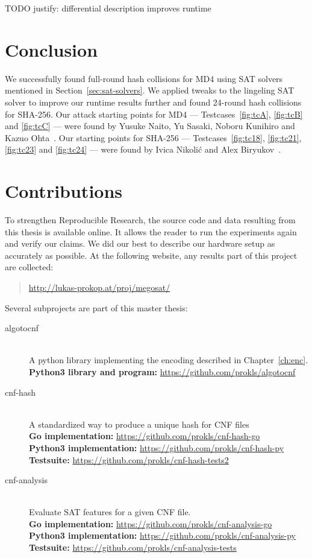 TODO justify: differential description improves runtime


\section{Conclusion}
\label{sec:conclusion}
%
We successfully found full-round hash collisions for MD4
using SAT solvers mentioned in Section~\ref{sec:sat-solvers}.
We applied tweaks to the lingeling SAT solver to improve our
runtime results further and found 24-round hash collisions
for SHA-256. Our attack starting points for MD4 ---
Testcases~\ref{fig:tcA}, \ref{fig:tcB} and \ref{fig:tcC} ---
were found by Yusuke Naito, Yu Sasaki, Noboru Kunihiro and
Kazuo Ohta~\cite{sasaki2007new}. Our starting points for SHA-256
--- Testcases~\ref{fig:tc18}, \ref{fig:tc21}, \ref{fig:tc23}
and \ref{fig:tc24} --- were found by Ivica Nikoli{\'c} and
Alex Biryukov~\cite{nikolic2008collisions}.

\section{Contributions}
\label{sec:contributions}
%
To strengthen Reproducible Research, the source code and data resulting from this thesis is available online.
It allows the reader to run the experiments again and verify our claims.
We did our best to describe our hardware setup as accurately as possible.
At the following website, any results part of this project are collected:

\begin{quote}
  \url{http://lukas-prokop.at/proj/megosat/}
\end{quote}

Several subprojects are part of this master thesis:
\begin{description}
\item[algotocnf]\hfill{} \\
  A python library implementing the encoding described in Chapter~\ref{ch:enc}. \\[4pt]
  \textbf{Python3 library and program:} \url{https://github.com/prokls/algotocnf}
\item[cnf-hash]\hfill{} \\
  A standardized way to produce a unique hash for CNF files \\[4pt]
  \textbf{Go implementation:} \url{https://github.com/prokls/cnf-hash-go} \\
  \textbf{Python3 implementation:} \url{https://github.com/prokls/cnf-hash-py} \\
  \textbf{Testsuite:} \url{https://github.com/prokls/cnf-hash-tests2}
\item[cnf-analysis]\hfill{} \\
  Evaluate SAT features for a given CNF file. \\[4pt]
  \textbf{Go implementation:} \url{https://github.com/prokls/cnf-analysis-go} \\
  \textbf{Python3 implementation:} \url{https://github.com/prokls/cnf-analysis-py} \\
  \textbf{Testsuite:} \url{https://github.com/prokls/cnf-analysis-tests}
\end{description}
